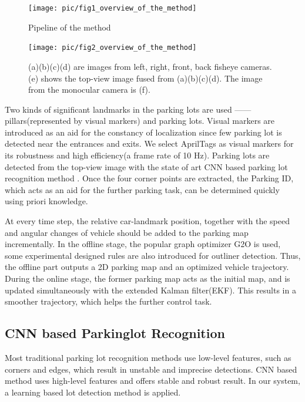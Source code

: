 \documentclass[journal]{IEEEtran}
\begin{document}
\begin{figure}[htbp]
\centering
\texttt{[image: pic/fig1\_overview\_of\_the\_method]}
\caption{Pipeline of the method}\label{fig:1}
\end{figure}

\begin{figure}
\centering
\texttt{[image: pic/fig2\_overview\_of\_the\_method]}
\caption{
(a)(b)(c)(d) are images from left, right, front, back fisheye cameras. 
(e) shows the top-view image fused from (a)(b)(c)(d). The image from the monocular camera is (f). 
}\label{fig:2}
\end{figure}

Two kinds of significant landmarks in the parking lots are used ——pillars(represented by visual markers) and parking lots. 
Visual markers are introduced as an aid for the constancy of localization since few parking lot is detected near the entrances and exits. 
We select AprilTags as visual markers for its robustness and high efficiency(a frame rate of 10 Hz). 
Parking lots are detected from the top-view image with the state of art CNN based parking lot recognition method \cite{Li2017Vision}. 
Once the four corner points are extracted, the Parking ID, which acts as an aid for the further parking task, can be determined quickly using priori knowledge.
	

At every time step, the relative car-landmark position, together with the speed and angular changes of vehicle should be added to the parking map incrementally. 
In the offline stage, the popular graph optimizer G2O is used, some experimental designed rules are also introduced for outliner detection. 
Thus, the offline part outputs a 2D parking map and an optimized vehicle trajectory. 
During the online stage, the former parking map acts as the initial map, and is updated simultaneously with the extended Kalman filter(EKF). 
This results in a smoother trajectory, which helps the further control task.


\subsection{CNN based Parkinglot Recognition}

Most traditional parking lot recognition methods use low-level features, such as corners and edges, which result in unstable and imprecise detections.
CNN based method uses high-level features and offers stable and robust result. 
In our system, a learning based lot detection method \cite{Li2017Vision} is applied.
\end{document}
